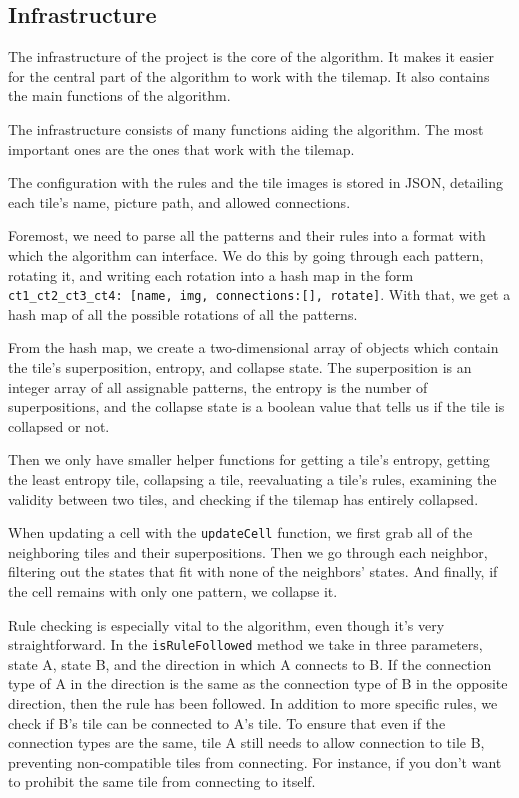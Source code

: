 \documentclass[10pt,twoside,a4paper]{article}
\begin{document}
\subsection{Infrastructure}\label{sec:infrastructure}
The infrastructure of the project is the core of the algorithm.
It makes it easier for the central part of the algorithm to work with the tilemap.
It also contains the main functions of the algorithm.

The infrastructure consists of many functions aiding the algorithm.
The most important ones are the ones that work with the tilemap.

The configuration with the rules and the tile images is stored in JSON, detailing each tile's name, picture path, and allowed connections.

Foremost, we need to parse all the patterns and their rules into a format with which the algorithm can interface.
We do this by going through each pattern, rotating it, and writing each rotation into a hash map in the form \texttt{ct1\_ct2\_ct3\_ct4: [name, img, connections:[], rotate]}. 
With that, we get a hash map of all the possible rotations of all the patterns.

From the hash map, we create a two-dimensional array of objects which contain the tile's superposition, entropy, and collapse state.
The superposition is an integer array of all assignable patterns, the entropy is the number of superpositions, and the collapse state is a boolean value that tells us if the tile is collapsed or not.

Then we only have smaller helper functions for getting a tile's entropy, getting the least entropy tile, collapsing a tile, reevaluating a tile's rules, examining the validity between two tiles, and checking if the tilemap has entirely collapsed.

When updating a cell with the \texttt{updateCell} function, we first grab all of the neighboring tiles and their superpositions.
Then we go through each neighbor, filtering out the states that fit with none of the neighbors' states.
And finally, if the cell remains with only one pattern, we collapse it.

Rule checking is especially vital to the algorithm, even though it's very straightforward.
In the \texttt{isRuleFollowed} method we take in three parameters, state A, state B, and the direction in which A connects to B.
If the connection type of A in the direction is the same as the connection type of B in the opposite direction, then the rule has been followed.
In addition to more specific rules, we check if B's tile can be connected to A's tile.
To ensure that even if the connection types are the same, tile A still needs to allow connection to tile B, preventing non-compatible tiles from connecting. For instance, if you don't want to prohibit the same tile from connecting to itself.
\end{document}
